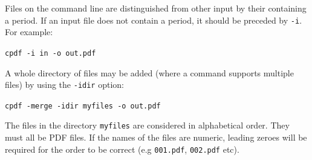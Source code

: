 \documentclass[a4paper,makeidx]{memoir}
\begin{document}
  Files on the command line are distinguished from other input by their
containing a period. If an input file does not contain a period, it should be
preceded by \verb!-i!. For example:

  \begin{framed}
  \small\verb!cpdf -i in -o out.pdf!
  \end{framed}
\noindent A whole directory of files may be added (where a command supports multiple files) by using the \verb!-idir! option:
  \begin{framed}
  \small\verb!cpdf -merge -idir myfiles -o out.pdf!
  \end{framed}
  \noindent The files in the directory \verb!myfiles! are considered in alphabetical order. They must all be PDF files. If the names of the files are numeric, leading zeroes will be required for the order to be correct (e.g \verb!001.pdf!, \verb!002.pdf! etc).
\end{document}
